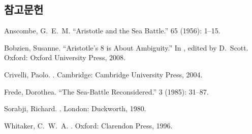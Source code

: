 \documentclass[12pt, a4paper]{article}
\begin{document}
\subsection*{참고문헌}
\begin{references}

 Anscombe, G.\ E.\ M. ``Aristotle and the Sea Battle.''  65 (1956): 1--15.

 Bobzien, Susanne. ``Aristotle's  8 is About Ambiguity.'' In , edited by D.\ Scott. Oxford: Oxford University Press, 2008.

 Crivelli, Paolo. . Cambridge: Cambridge University Press, 2004.

 Frede, Dorothea. ``The Sea-Battle Reconsidered.''  3 (1985): 31--87.

 Sorabji, Richard. . London: Duckworth, 1980.

 Whitaker, C.\ W.\ A. . Oxford: Clarendon Press, 1996.

\end{references}
\end{document}
